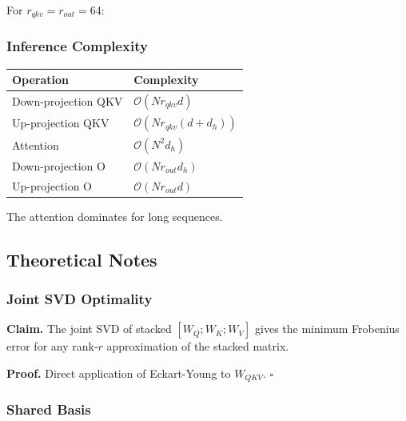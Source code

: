 For $r_{qkv} = r_{out} = 64$:
\subsubsection{Inference Complexity}

\begin{table}[H]
\centering
\small
\begin{tabular}{ll}
\toprule
\textbf{Operation} & \textbf{Complexity} \\
\midrule
Down-projection QKV & $\mathcal{O}(N r_{qkv} d)$ \\
Up-projection QKV & $\mathcal{O}(N r_{qkv} (d + d_h))$ \\
Attention & $\mathcal{O}(N^2 d_h)$ \\
Down-projection O & $\mathcal{O}(N r_{out} d_h)$ \\
Up-projection O & $\mathcal{O}(N r_{out} d)$ \\
\bottomrule
\end{tabular}
\end{table}

The attention dominates for long sequences.

\subsection{Theoretical Notes}

\subsubsection{Joint SVD Optimality}

\textbf{Claim.} The joint SVD of stacked $[W_Q; W_K; W_V]$ gives the minimum 
Frobenius error for any rank-$r$ approximation of the stacked matrix.

\textbf{Proof.} Direct application of Eckart-Young to $W_{QKV}$. $\square$

\subsubsection{Shared Basis}

